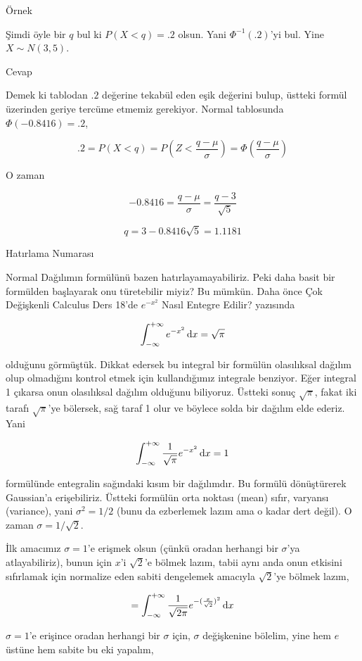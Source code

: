 \documentclass[12pt,fleqn]{article}\usepackage{../../common}
\begin{document}
Örnek 

Şimdi öyle bir $q$ bul ki $P(X < q) = .2$ olsun. Yani $\Phi^{-1}(.2)$'yi
bul. Yine $X \sim N(3,5)$. 

Cevap 

Demek ki tablodan $.2$ değerine tekabül eden eşik değerini bulup, üstteki
formül üzerinden geriye tercüme etmemiz gerekiyor. Normal tablosunda
$\Phi(-0.8416) = .2$, 

$$ .2 = P(X<q) = P( Z < \frac{ q - \mu}{\sigma}) = \Phi(\frac{ q - \mu}{\sigma})
$$

O zaman 

$$ -0.8416 = \frac{q - \mu}{\sigma} = \frac{ q - 3}{\sqrt{ 5}} $$

$$ q = 3 - 0.8416 \sqrt{ 5} = 1.1181 $$

Hatırlama Numarası

Normal Dağılımın formülünü bazen hatırlayamayabiliriz. Peki daha basit bir
formülden başlayarak onu türetebilir miyiz? Bu mümkün. Daha önce Çok
Değişkenli Calculus Ders 18'de $e^{-x^2}$ Nasıl Entegre Edilir? yazısında

$$ \int _{-\infty}^{+\infty} e^{-x^2} \,\mathrm{d} x= \sqrt{\pi} $$

olduğunu görmüştük. Dikkat edersek bu integral bir formülün olasılıksal dağılım
olup olmadığını kontrol etmek için kullandığımız integrale benziyor. Eğer
integral 1 çıkarsa onun olasılıksal dağılım olduğunu biliyoruz. Üstteki sonuç
$\sqrt{\pi}$, fakat iki tarafı $\sqrt{\pi}$'ye bölersek, sağ taraf 1 olur ve
böylece solda bir dağılım elde ederiz. Yani

$$ \int _{-\infty}^{+\infty} \frac{1}{\sqrt{\pi}} e^{-x^2} \,\mathrm{d} x = 1$$

formülünde entegralin sağındaki kısım bir dağılımdır. Bu formülü dönüştürerek
Gaussian'a erişebiliriz. Üstteki formülün orta noktası (mean) sıfır, varyansı
(variance), yani $\sigma^2 = 1/2$ (bunu da ezberlemek lazım ama o kadar dert
değil). O zaman $\sigma = 1 / \sqrt{2}$.

İlk amacımız $\sigma = 1$'e erişmek olsun (çünkü oradan herhangi bir $\sigma$'ya
atlayabiliriz), bunun için $x$'i $\sqrt{2}$'e bölmek lazım, tabii aynı anda onun
etkisini sıfırlamak için normalize eden sabiti dengelemek amacıyla $\sqrt{2}$'ye
bölmek lazım,

$$
= \int _{-\infty}^{+\infty}
\frac{1}{\sqrt{2\pi}} e^{-(\frac{x}{\sqrt{2}})^2}\,\mathrm{d} x
$$

$\sigma = 1$'e erişince oradan herhangi bir $\sigma$ için, $\sigma$ değişkenine
bölelim, yine hem $e$ üstüne hem sabite bu eki yapalım,
\end{document}
